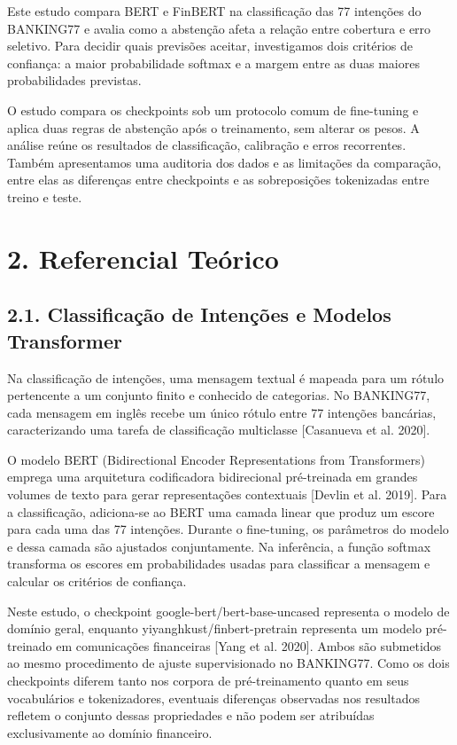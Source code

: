 \documentclass[12pt,a4paper]{article}
\begin{document}
Este estudo compara BERT e FinBERT na classificação das 77 intenções do BANKING77 e avalia como a abstenção afeta a relação entre cobertura e erro seletivo. Para decidir quais previsões aceitar, investigamos dois critérios de confiança: a maior probabilidade softmax e a margem entre as duas maiores probabilidades previstas.

O estudo compara os checkpoints sob um protocolo comum de fine-tuning e aplica duas regras de abstenção após o treinamento, sem alterar os pesos. A análise reúne os resultados de classificação, calibração e erros recorrentes. Também apresentamos uma auditoria dos dados e as limitações da comparação, entre elas as diferenças entre checkpoints e as sobreposições tokenizadas entre treino e teste.

\section*{\textbf{2. Referencial Teórico}}

\subsection*{\textbf{2.1. Classificação de Intenções e Modelos Transformer}}

Na classificação de intenções, uma mensagem textual é mapeada para um rótulo pertencente a um conjunto finito e conhecido de categorias. No BANKING77, cada mensagem em inglês recebe um único rótulo entre 77 intenções bancárias, caracterizando uma tarefa de classificação multiclasse [Casanueva et al. 2020].

O modelo BERT (Bidirectional Encoder Representations from Transformers) emprega uma arquitetura codificadora bidirecional pré-treinada em grandes volumes de texto para gerar representações contextuais [Devlin et al. 2019]. Para a classificação, adiciona-se ao BERT uma camada linear que produz um escore para cada uma das 77 intenções. Durante o fine-tuning, os parâmetros do modelo e dessa camada são ajustados conjuntamente. Na inferência, a função softmax transforma os escores em probabilidades usadas para classificar a mensagem e calcular os critérios de confiança.

Neste estudo, o checkpoint google-bert/bert-base-uncased representa o modelo de domínio geral, enquanto yiyanghkust/finbert-pretrain representa um modelo pré-treinado em comunicações financeiras [Yang et al. 2020]. Ambos são submetidos ao mesmo procedimento de ajuste supervisionado no BANKING77. Como os dois checkpoints diferem tanto nos corpora de pré-treinamento quanto em seus vocabulários e tokenizadores, eventuais diferenças observadas nos resultados refletem o conjunto dessas propriedades e não podem ser atribuídas exclusivamente ao domínio financeiro.
\end{document}
